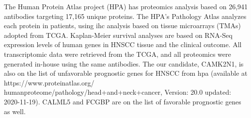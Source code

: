 \documentclass[jpm,article,submit,moreauthors,pdftex]{Definitions/mdpi}
\begin{document}
\begin{paracol}{2}
 
The Human Protein Atlas project (HPA) has proteomics analysis based on 26,941 antibodies targeting 17,165 unique proteins. The HPA's Pathology Atlas analyzes each protein in patients, using \acrshort{ihc} analysis based on tissue microarrays (TMAs) adopted from TCGA. Kaplan-Meier survival analyses are based on RNA-Seq expression levels of human genes in HNSCC tissue and the clinical outcome.
All transcriptomic data were retrieved from the TCGA, and all proteomics were generated in-house using the same antibodies.
The our candidate, CAMK2N1, is also on the list of unfavorable prognostic genes for HNSCC from \acrshort{hpa} (available at https://www.proteinatlas.org/\\humanproteome/pathology/head+and+neck+cancer, Version: 20.0 updated: 2020-11-19). 
CALML5 and FCGBP are on the list of favorable prognostic genes as well.








\end{paracol}
\end{document}
